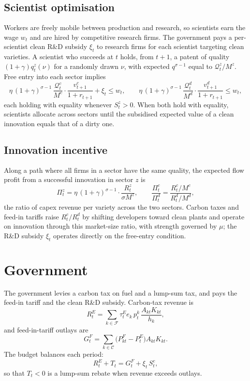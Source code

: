 \documentclass[12pt]{article}
\begin{document}
\subsection{Scientist optimisation}

Workers are freely mobile between production and research, so
scientists earn the wage $w_t$ and are hired by competitive research
firms. The government pays a per-scientist clean R\&D subsidy $\xi_t$
to research firms for each scientist targeting clean varieties. A
scientist who succeeds at $t$ holds, from $t+1$, a patent of quality
$(1+\gamma)q^z_t(\nu)$ for a randomly drawn $\nu$, with expected
$q^{\sigma-1}$ equal to $\mathcal Q^z_t/M^z$. Free entry into each
sector implies
\[
\eta\,(1+\gamma)^{\sigma-1}\,\frac{\mathcal Q^c_t}{M^c}\cdot
\frac{v^c_{t+1}}{1+r_{t+1}}+\xi_t\le w_t,
\qquad
\eta\,(1+\gamma)^{\sigma-1}\,\frac{\mathcal Q^d_t}{M^d}\cdot
\frac{v^d_{t+1}}{1+r_{t+1}}\le w_t,
\]
each holding with equality whenever $S^z_t>0$. When both hold with
equality, scientists allocate across sectors until the subsidised
expected value of a clean innovation equals that of a dirty one.

\subsection{Innovation incentive}

Along a path where all firms in a sector have the same quality, the
expected flow profit from a successful innovation in sector $z$ is
\[
\Pi^z_t=\eta\,(1+\gamma)^{\sigma-1}\cdot\frac{R^z_t}{\sigma M^z},
\qquad
\frac{\Pi^c_t}{\Pi^d_t}=\frac{R^c_t/M^c}{R^d_t/M^d},
\]
the ratio of capex revenue per variety across the two sectors. Carbon
taxes and feed-in tariffs raise $R^c_t/R^d_t$ by shifting developers
toward clean plants and operate on innovation through this market-size
ratio, with strength governed by $\mu$; the R\&D subsidy $\xi_t$
operates directly on the free-entry condition.

\section{Government}

The government levies a carbon tax on fuel and a lump-sum tax, and pays
the feed-in tariff and the clean R\&D subsidy. Carbon-tax revenue is
\[
R^E_t=\sum_{k\in\mathcal F}\tau^E_te_k\,p^k_t\,\frac{A_{kt}K_{kt}}{h_k},
\]
and feed-in-tariff outlays are
\[
G^F_t=\sum_{k\in\mathcal C}\big(P^F_{kt}-P^E_t\big)A_{kt}K_{kt}.
\]
The budget balances each period:
\[
R^E_t+T_t=G^F_t+\xi_t\,S^c_t ,
\]
so that $T_t<0$ is a lump-sum rebate when revenue exceeds outlays.
\end{document}
